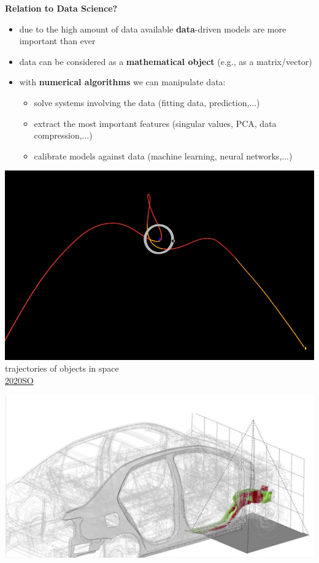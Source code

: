 \begin{frame}[c]
	\textbf{Relation to Data Science?}~\\
	\begin{itemize}
		\item due to the high amount of data available \textbf{data}-driven models are more important than ever \Vspace{0.2cm}
		\item data can be considered
		as a \textbf{mathematical object} (e.g., as a matrix/vector) \Vspace{0.2cm}
		\item with \textbf{numerical algorithms} we can manipulate data:\Vspace{0.2cm}
		\begin{itemize}\normalsize
			\item solve systems involving the data (fitting data, prediction,...)
			\vspace{0.2cm}\item extract the most important features (singular values, PCA, data compression,...) 
			\vspace{0.2cm}\item calibrate models against data (machine learning, neural networks,...)
		\end{itemize}
	\end{itemize}	
    \Vspace{2cm}
	\begin{minipage}[t]{0.25\textwidth}\centering
		\includegraphics[width=\textwidth]{media/trajectories_2020SO.jpg}\\
		trajectories of objects in space \\
		\hyperref{https://en.wikipedia.org/wiki/2020_SO\#/media/File:2020SO_b.gif}{}{}{2020SO} 
	\end{minipage}
	\begin{minipage}[t]{0.25\textwidth}\centering
		\includegraphics[width=\textwidth]{media/carcrash_sim.png}\\

\end{minipage}
\end{frame}
